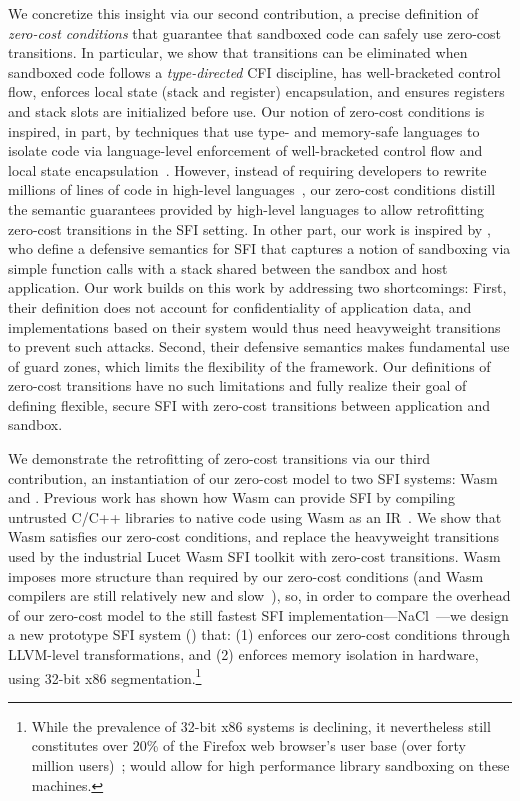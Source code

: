 We concretize this insight via our second contribution, a precise definition of
\emph{zero-cost conditions} that guarantee that sandboxed code can safely use
zero-cost transitions.
%
In particular, we show that transitions can be eliminated 
when sandboxed code follows a \emph{type-directed} CFI discipline, 
has well-bracketed control flow, enforces local state 
(stack and register) encapsulation, and ensures registers 
and stack slots are initialized before use.
%
Our notion of zero-cost conditions is inspired, in part, by techniques that use
type- and memory-safe languages to isolate code via language-level enforcement
of well-bracketed control flow and local state encapsulation~\cite{ocap, joe,
trufflec, caja, hunt2007singularity, morrisett_talx86_1999}.
%
However, instead of requiring developers to rewrite millions of lines of code
in high-level languages~\cite{gang-sfi}, our zero-cost conditions distill the
semantic guarantees provided by high-level languages to allow retrofitting
zero-cost transitions in the SFI setting.
%
In other part, our work is inspired by \citet{sfi-as-ai}, who define a
defensive semantics for SFI that captures a notion of sandboxing via simple
function calls with a stack shared between the sandbox and host application.
%
Our work builds on this work by addressing two shortcomings:
%
First, their definition does not account for confidentiality of application
data, and implementations based on their system would thus need heavyweight
transitions to prevent such attacks.
%
Second, their defensive semantics makes fundamental use of guard zones, which
limits the flexibility of the framework.
%
Our definitions of zero-cost transitions have no such limitations and fully
realize their goal of defining flexible, secure SFI with zero-cost transitions
between application and sandbox.

%
We demonstrate the retrofitting of zero-cost transitions via our third
contribution, an instantiation of our zero-cost model to two SFI systems: Wasm
and \trsegmentsfi.
%
Previous work has shown how Wasm can provide SFI by compiling untrusted C/C++
libraries to native code using Wasm as an IR~\cite{wasm-il,wasmboxc,gobi,rlbox}.
%
We show that Wasm satisfies our zero-cost conditions, and replace the
heavyweight transitions used by the industrial Lucet Wasm SFI toolkit with
zero-cost transitions.
% 
Wasm imposes more structure than required by our zero-cost conditions (and
Wasm compilers are still relatively new and slow~\cite{not-so-fast}), so, in order to
compare the overhead of our zero-cost model to the still fastest SFI
implementation\dash---NaCl~\cite{yee_native_2009}\dash---we design a new
prototype SFI system (\trsegmentsfi) that: (1) enforces our zero-cost conditions
through LLVM-level transformations, and (2) enforces memory isolation in
hardware, using 32-bit x86 segmentation.\footnote{While the prevalence of 32-bit
x86 systems is declining, it nevertheless still constitutes over 20\% of the
Firefox web browser's user base (over forty million users)~\cite{ff-stats};
\trsegmentsfi would allow for high performance library sandboxing on these
machines.}

